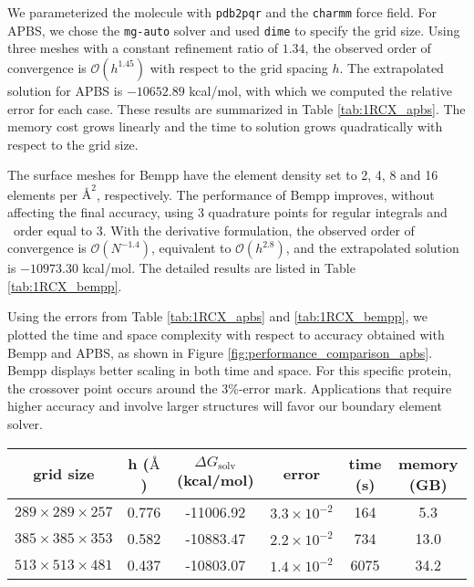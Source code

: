 We parameterized the molecule with \texttt{pdb2pqr} and the \texttt{charmm} force field. 
For APBS, we chose the \texttt{mg-auto} solver and used \texttt{dime} to specify the grid size.
Using three meshes with a constant refinement ratio of $1.34$, the observed order of convergence is $\mathcal{O}(h^{1.45})$ with respect to the grid spacing $h$.
The extrapolated solution for APBS is $-10652.89$ kcal/mol, with which we computed the relative error for each case.
These results are summarized in Table \ref{tab:1RCX_apbs}.
The memory cost grows linearly and the time to solution grows quadratically with respect to the grid size.

The surface meshes for Bempp have the element density set to 2, 4, 8 and 16 elements per $\si{\angstrom}^{2}$, respectively.
The performance of Bempp improves, without affecting the final accuracy, using 3 quadrature points for regular integrals and \fmm\ order equal to 3.
With the derivative formulation, the observed order of convergence is $\mathcal{O}(N^{-1.4})$, equivalent to $\mathcal{O}(h^{2.8})$, and the extrapolated solution is $-10973.30$ kcal/mol.
The detailed results are listed in Table \ref{tab:1RCX_bempp}.

Using the errors from Table \ref{tab:1RCX_apbs} and \ref{tab:1RCX_bempp}, we plotted the time and space complexity with respect to accuracy obtained with Bempp and APBS, as shown in Figure \ref{fig:performance_comparison_apbs}.
Bempp displays better scaling in both time and space.
For this specific protein, the crossover point occurs around the 3\%-error mark.
Applications that require higher accuracy and involve larger structures will favor our boundary element solver.

\begin{table*}[]
    \centering
    \begin{tabular}{cc|cc|cc}
    grid size                   & h ($\si{\angstrom}$) & $\Delta G_{\mathrm{solv}}$ (kcal/mol) & error               & time (s) & memory (GB) \\ \hline
    $289 \times 289 \times 257$ & 0.776                & -11006.92                             & $3.3\times 10^{-2}$ & 164      & 5.3         \\
    $385 \times 385 \times 353$ & 0.582                & -10883.47                             & $2.2\times 10^{-2}$ & 734      & 13.0        \\
    $513 \times 513 \times 481$ & 0.437                & -10803.07                             & $1.4\times 10^{-2}$ & 6075     & 34.2       
    \end{tabular}
    \caption{Results from computing the solvation energy of 1RCX using the \texttt{mg-auto} solver in APBS.
    Error is calculated based on the extrapolated solution $-10652.89$ kcal/mol.}
    \label{tab:1RCX_apbs}
\end{table*}

